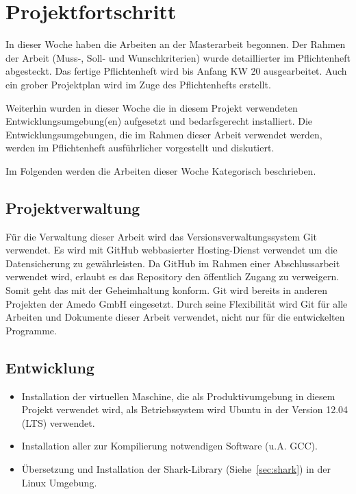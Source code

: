\documentclass[a4paper,12pt,fleqn]{scrartcl}
\begin{document}
\section[Fortschritt]{Projektfortschritt}
In dieser Woche haben die Arbeiten an der Masterarbeit begonnen. Der Rahmen der Arbeit (Muss-, Soll- und Wunschkriterien)
wurde detaillierter im Pflichtenheft abgesteckt. Das fertige Pflichtenheft wird bis Anfang KW 20 ausgearbeitet. Auch ein grober Projektplan wird im Zuge des Pflichtenhefts erstellt.

Weiterhin wurden in dieser Woche die in diesem Projekt verwendeten Entwicklungsumgebung(en) aufgesetzt und bedarfsgerecht
installiert. Die Entwicklungsumgebungen, die im Rahmen dieser Arbeit verwendet werden, werden im Pflichtenheft ausführlicher vorgestellt und diskutiert.

Im Folgenden werden die Arbeiten dieser Woche Kategorisch beschrieben.

\subsection{Projektverwaltung}
Für die Verwaltung dieser Arbeit wird das Versionsverwaltungssystem Git verwendet. Es wird mit GitHub \cite{github} webbasierter
Hosting-Dienst verwendet um die Datensicherung zu gewährleisten. Da GitHub im Rahmen einer Abschlussarbeit verwendet wird, erlaubt
es das Repository den öffentlich Zugang zu verweigern. Somit geht das mit der Geheimhaltung konform. Git wird bereits
in anderen Projekten der Amedo GmbH eingesetzt. Durch seine Flexibilität wird Git für alle Arbeiten und Dokumente dieser Arbeit verwendet, nicht nur für die entwickelten Programme.

\subsection{Entwicklung}
\begin{itemize}
  \item Installation der virtuellen Maschine, die als Produktivumgebung in diesem Projekt verwendet wird, als Betriebssystem wird Ubuntu in der Version 12.04 (LTS) verwendet.
  \item Installation aller zur Kompilierung notwendigen Software (u.A. GCC).
  \item Übersetzung und Installation der Shark-Library (Siehe~\ref{sec:shark}) in der Linux Umgebung.
\end{itemize}
\end{document}
